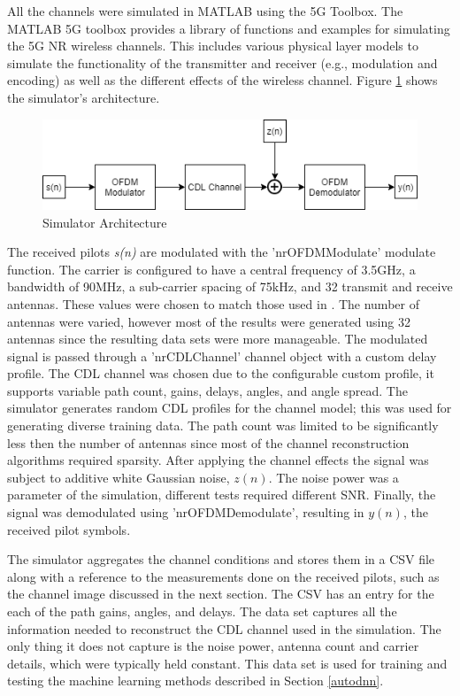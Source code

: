 All the channels were simulated in MATLAB using the 5G Toolbox. The MATLAB 5G toolbox provides a library of functions and examples for simulating the 5G NR wireless channels. This includes various physical layer models to simulate the functionality of the transmitter and receiver (e.g., modulation and encoding) as well as the different effects of the wireless channel. Figure \ref{fig:sim} shows the simulator's architecture.
\begin{figure}[H]
\centering
\includegraphics[width=15cm]{figures/SYSC5804-SimulationOverview.png}
\caption{Simulator Architecture}
\label{fig:sim}
\end{figure}
\noindent
The received pilots \textit{s(n)} are modulated with the 'nrOFDMModulate' modulate function. The carrier is configured to have a central frequency of 3.5GHz, a bandwidth of 90MHz, a sub-carrier spacing of 75kHz, and 32 transmit and receive antennas. These values were chosen to match those used in \cite{Li2020}. The number of antennas were varied, however most of the results were generated using 32 antennas since the resulting data sets were more manageable.  The modulated signal is passed through a 'nrCDLChannel' channel object with a custom delay profile. The CDL channel was chosen due to the configurable custom profile, it supports variable path count, gains, delays, angles, and angle spread. The simulator generates random CDL profiles for the channel model; this was used for generating diverse training data. The path count was limited to be significantly less then the number of antennas since most of the channel reconstruction algorithms required sparsity. After applying the channel effects the signal was subject to additive white Gaussian noise, $z(n)$. The noise power was a parameter of the simulation, different tests required different SNR. Finally, the signal was demodulated using 'nrOFDMDemodulate', resulting in $y(n)$, the received pilot symbols. 

The simulator aggregates the channel conditions and stores them in a CSV file along with a reference to the measurements done on the received pilots, such as the channel image discussed in the next section. The CSV has an entry for the each of the path gains, angles, and delays. The data set captures all the information needed to reconstruct the CDL channel used in the simulation. The only thing it does not capture is the noise power, antenna count and carrier details, which were typically held constant. This data set is used for training and testing the machine learning methods described in Section \ref{autodnn}.

